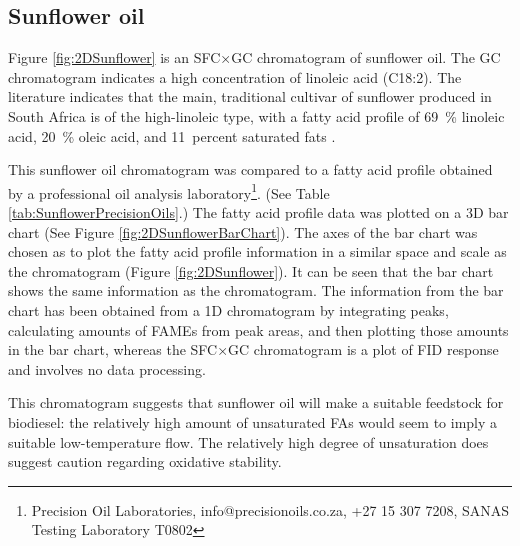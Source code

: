 \subsection{Sunflower oil}

Figure \ref{fig:2DSunflower} is an SFC×GC chromatogram of sunflower oil. The GC
chromatogram indicates a high concentration of linoleic acid (C18:2). The
literature indicates that the main, traditional cultivar of sunflower
produced in South Africa is of the high-linoleic type, with a fatty acid profile
of \SI{69}{\percent} linoleic acid, \SI{20}{\percent} oleic acid, and
\SI{11}{percent} saturated fats \autocite {JFAOWHOCAC2019}.

This sunflower oil chromatogram was compared to a fatty acid profile obtained by
a professional oil analysis laboratory\footnote{Precision Oil Laboratories,
info@precisionoils.co.za,  +27 15 307 7208, SANAS Testing Laboratory T0802}.
(See Table \ref{tab:SunflowerPrecisionOils}.) The fatty acid profile data was
plotted on a 3D bar chart (See Figure \ref{fig:2DSunflowerBarChart}). The axes
of the bar chart was chosen as to plot the fatty acid profile information in a
similar space and scale as the chromatogram (Figure \ref{fig:2DSunflower}). It
can be seen that the bar chart shows the same information as the chromatogram.
The information from the bar chart has been obtained from a 1D chromatogram by
integrating peaks, calculating amounts of FAMEs from peak areas, and then
plotting those amounts in the bar chart, whereas the SFC×GC chromatogram is a
plot of FID response and involves no data processing.

This chromatogram suggests that sunflower oil will make a suitable feedstock for
biodiesel: the relatively high amount of unsaturated FAs would seem to imply a
suitable low-temperature flow. The relatively high degree of unsaturation does
suggest caution regarding oxidative stability.

